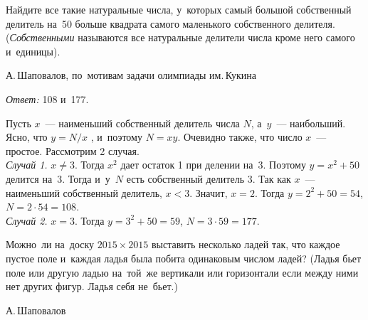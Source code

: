 \begin{problems}

\item
Найдите все такие натуральные числа, у~которых самый большой собственный
делитель на~50 больше квадрата самого маленького собственного делителя.
(\emph{Собственными} называются все натуральные делители числа кроме него самого
и~единицы).
\begingroup\em\small\par\strut\hfill
    А.\,Шаповалов, по~мотивам задачи олимпиады им.\,Кукина
\endgroup
\end{problems}

\ifincludesolutions
\emph{Ответ:} 108 и~177.
\par
Пусть $x$~--- наименьший собственный делитель числа $N$, а~$y$~--- наибольший.
Ясно, что $y = N / x$ , и~поэтому $N = x y$.
Очевидно также, что число $x$~--- простое.
Рассмотрим 2 случая.
\\
\emph{Случай 1.} $x \neq 3$.
Тогда $x^2$ дает остаток 1 при делении на~3.
Поэтому $y = x^2 + 50$ делится на~3.
Тогда и~у~$N$ есть собственный делитель 3.
Так как $x$~--- наименьший собственный делитель, $x < 3$.
Значит, $x = 2$.
Тогда $y = 2^2 + 50 = 54$, $N = 2 \cdot 54 = 108$.
\\
\emph{Случай 2.} $x = 3$.
Тогда $y = 3^2 + 50 = 59$, $N = 3 \cdot 59 = 177$.
\fi %

\begin{problems}

\item
Можно~ли на~доску $2015 \times 2015$ выставить несколько ладей так, что каждое
пустое поле и~каждая ладья была побита одинаковым числом ладей?
(Ладья бьет поле или другую ладью на~той~же вертикали или горизонтали если
между ними нет других фигур.
Ладья себя не~бьет.)
\begingroup\em\small\par\strut\hfill
    А.\,Шаповалов
\endgroup
\end{problems}

